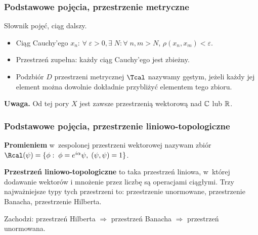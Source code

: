 \documentclass[10pt,t]{beamer}
\begin{document}
\begin{frame}
  \frametitle{Podstawowe pojęcia, przestrzenie metryczne}


  Słownik pojęć, ciąg dalszy.
  \begin{itemize}
    \RaggedRight

  \item Ciąg Cauchy’ego $x_{ n }$: $\forall \; \varepsilon > 0, \exists \; N: \forall \; n, m > N$, $
    \rho ( x_{ n }, x_{ m } ) < \varepsilon $.

  \item Przestrzeń zupełna: każdy ciąg Cauchy’ego jest zbieżny.

  \item Podzbiór $D$ przestrzeni metrycznej $\Tcal$ nazywamy gęstym, jeżeli
    każdy jej element można dowolnie dokładnie przybliżyć elementem tego
    zbioru.

  \end{itemize}



  \textbf{Uwaga.}
  Od tej pory $X$ jest zawsze przestrzenią wektorową nad $\mathbb{C}$ lub $\mathbb{R}$.

\end{frame}





\begin{frame}
  \frametitle{Podstawowe pojęcia, przestrzenie liniowo-topologiczne}


  \textbf{Promieniem} w~zespolonej przestrzeni wektorowej nazywam zbiór
  $\Rcal ( \psi ) = \{ \phi : \; \phi = e^{ i \alpha } \psi ,\; ( \psi, \psi ) = 1 \}$.

  \textbf{Przestrzeń liniowo-topologiczne} to taka przestrzeń liniowa,
  w~której dodawanie wektorów i mnożenie przez liczbę są operacjami ciągłymi.
  Trzy najważniejsze typy tych przestrzeni to: przestrzenie unormowane,
  przestrzenie Banacha, przestrzenie Hilberta.

  Zachodzi: przestrzeń Hilberta $\Rightarrow$ przestrzeń Banacha $\Rightarrow$ przestrzeń
  unormowana.

\end{frame}
\end{document}
